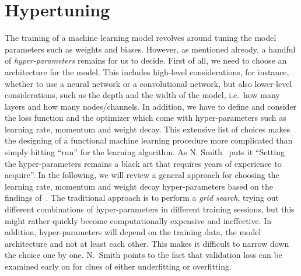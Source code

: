 \section{Hypertuning}\label{sec:hypertuning}
The training of a machine learning model revolves around tuning the model parameters such as weights and biases. However, as mentioned already, a handful of \textit{hyper-parameters} remains for us to decide. First of all, we need to choose an architecture for the model. This includes high-level considerations, for instance, whether to use a neural network or a convolutional network, but also lower-level considerations, such as the depth and the width of the model, i.e.\ how many layers and how many nodes/channels. In addition, we have to define and consider the loss function and the optimizer which come with hyper-parameters such as learning rate, momentum and weight decay. This extensive list of choices makes the designing of a functional machine learning procedure more complicated than simply hitting ``run'' for the learning algorithm. As N. Smith~\cite{smith2018disciplined} puts it ``Setting the
hyper-parameters remains a black art that requires years of experience to
acquire''. In the following, we will review a general approach for choosing the learning rate, momentum and weight decay hyper-parameters based on the findings of~\cite{smith2018disciplined}. The traditional approach is to
perform a \textit{grid search}, trying out different combinations of hyper-parameters in different training sessions, but this might rather quickly become computationally expensive and ineffective. In addition, hyper-parameters will depend on the training data, the model architecture and not at least each other. This makes it difficult to narrow down the choice one by one. N.\ Smith points to the fact that validation loss can be examined early on for
clues of either underfitting or overfitting. 

